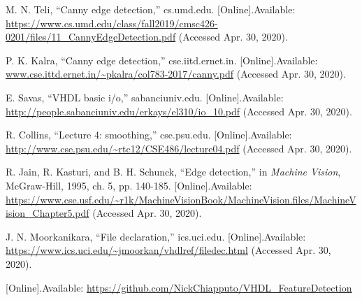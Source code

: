 \documentclass[12pt]{article}
\begin{document}
	\begin{thebibliography}{00}
		 M. N. Teli, ``Canny edge detection,'' cs.umd.edu. [Online].Available: \url{https://www.cs.umd.edu/class/fall2019/cmsc426-0201/files/11_CannyEdgeDetection.pdf} (Accessed Apr. 30, 2020).

		 P. K. Kalra, ``Canny edge detection,'' cse.iitd.ernet.in. [Online].Available: \url{www.cse.ittd.ernet.in/~pkalra/col783-2017/canny.pdf} (Accessed Apr. 30, 2020).

		 E. Savas, ``VHDL basic i/o,'' sabanciuniv.edu. [Online].Available: \url{http://people.sabanciuniv.edu/erkays/el310/io_10.pdf} (Accessed Apr. 30, 2020).

		 R. Collins, ``Lecture 4: smoothing,'' cse.psu.edu. [Online].Available: \url{http://www.cse.psu.edu/~rtc12/CSE486/lecture04.pdf} (Accessed Apr. 30, 2020).

		 R. Jain, R. Kasturi, and B. H. Schunck, ``Edge detection,'' in \textit{Machine Vision}, McGraw-Hill, 1995, ch. 5, pp. 140-185. [Online].Available: \url{https://www.cse.usf.edu/~r1k/MachineVisionBook/MachineVision.files/MachineVision_Chapter5.pdf} (Accessed Apr. 30, 2020).

		 J. N. Moorkanikara, ``File declaration,'' ics.uci.edu. [Online].Available: \url{https://www.ics.uci.edu/~jmoorkan/vhdlref/filedec.html} (Accessed Apr. 30, 2020).

		 [Online].Available: \url{https://github.com/NickChiapputo/VHDL_FeatureDetection}
	\end{thebibliography}
\end{document}
